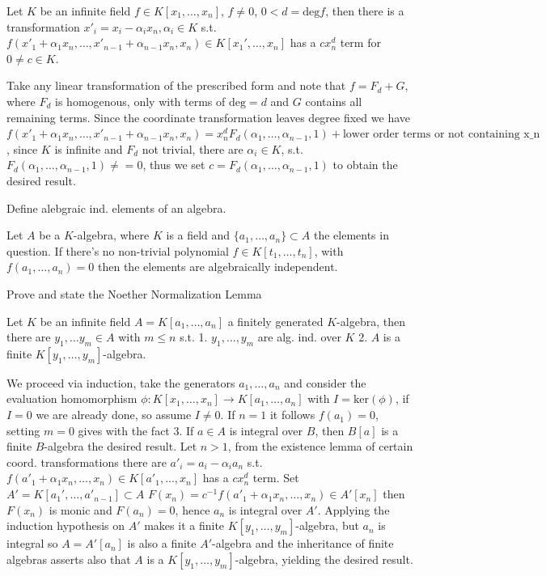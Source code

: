 Let \(K\) be an infinite field \(f \in K[x_1, \dots, x_n]\), \(f \neq 0\), \(0 < d = \text{deg}f\), then there is a transformation
\(x'_i = x_i - \alpha_i x_n, \alpha_i \in K\) s.t. \(f(x'_1 + \alpha_1 x_n, \dots, x'_{n-1} + \alpha_{n-1} x_n, x_n) \in K[x_1', \dots, x_n]\)
has a \(cx^{d}_n\) term for \(0 \neq c \in K\).

Take any linear transformation of the prescribed form and note that \(f = F_d + G\), where \(F_d\) is homogenous, only with terms of \(\text{deg} = d\)
and \(G\) contains all remaining terms. Since the coordinate transformation leaves degree fixed we have 
\(f(x'_1 + \alpha_1 x_n, \dots, x'_{n-1} + \alpha_{n-1} x_n, x_n) = x^{d}_n F_d(\alpha_1, \dots, \alpha_{n-1}, 1) + \text{lower order terms or not containing x_n}\),
since \(K\) is infinite and \(F_d\) not trivial, there are \(\alpha_i \in K\), s.t. \(F_d(\alpha_1, \dots, \alpha_{n-1}, 1) \neq = 0\), thus we set \(c = F_d(\alpha_1, \dots, \alpha_{n-1}, 1)\) to obtain the desired result.

Define alebgraic ind. elements of an algebra.

Let \(A\) be a \(K\)-algebra, where \(K\) is a field and \(\{a_1, \dots, a_n\} \subset A\) the elements in question. 
If there's no non-trivial polynomial \(f \in K[t_1, \dots, t_n]\), with \(f(a_1, \dots, a_n) = 0\) then the elements are algebraically independent.

Prove and state the Noether Normalization Lemma

Let \(K\) be an infinite field \(A = K[a_1, \dots, a_n]\) a finitely generated \(K\)-algebra, then there are \(y_1, \dots y_m \in A\) with \(m \leq n\)
s.t.
1. \(y_1, \dots, y_m\) are alg. ind. over \(K\)
2. \(A\) is a finite \(K[y_1, \dots, y_m]\)-algebra.

We proceed via induction, take the generators \(a_1, \dots, a_n\) and consider the evaluation homomorphism 
\(\phi : K[x_1, \dots, x_n] \to K[a_1, \dots, a_n]\) with \(I = \text{ker}(\phi)\), if \(I = 0\) we are already done, so assume
\(I \neq 0\). If \(n = 1\) it follows \(f(a_1) = 0\), setting \(m = 0\) gives with the fact
3. If \(a \in A\) is integral over \(B\), then \(B[a]\) is a finite \(B\)-algebra
the desired result.
Let \(n > 1\), from the existence lemma of certain coord. transformations there are \(a'_i = a_i - \alpha_i a_n\)
s.t. \(f(a'_1 + \alpha_1 x_n, \dots, x_n) \in K[a'_1, \dots, x_n]\) has a \(c x_n^{d}\) term. Set 
\(A' = K[a_1', \dots, a'_{n-1}] \subset A\)
\(F(x_n) = c^{-1} f(a'_1 + \alpha_1 x_n, \dots, x_n) \in A'[x_n]\)
then \(F(x_n)\) is monic and \(F(a_n) = 0\), hence \(a_n\) is integral over \(A'\).
Applying the induction hypothesis on \(A'\) makes it a finite \(K[y_1, \dots, y_m]\)-algebra, but \(a_n\) is integral
so \(A = A'[a_n]\) is also a finite \(A'\)-algebra and the inheritance of finite algebras asserts also that \(A\) is a \(K[y_1, \dots, y_m]\)-algebra, 
yielding the desired result.


